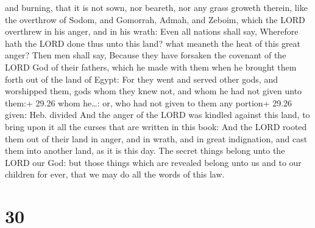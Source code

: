 and burning, that it is not sown, nor beareth, nor any grass groweth
therein, like the overthrow of Sodom, and Gomorrah, Admah, and Zeboim,
which the LORD overthrew in his anger, and in his wrath: 
Even all nations shall say, Wherefore hath the LORD done thus unto this
land? what meaneth the heat of this great anger?  Then men
shall say, Because they have forsaken the covenant of the LORD God of
their fathers, which he made with them when he brought them forth out of
the land of Egypt:  For they went and served other gods,
and worshipped them, gods whom they knew not, and whom he had not given
unto them:+ 29.26 whom he\ldots: or, who had not given to them any
portion+ 29.26 given: Heb. divided  And the anger of the
LORD was kindled against this land, to bring upon it all the curses that
are written in this book:  And the LORD rooted them out of
their land in anger, and in wrath, and in great indignation, and cast
them into another land, as it is this day.  The secret
things belong unto the LORD our God: but those things which are revealed
belong unto us and to our children for ever, that we may do all the
words of this law.

\hypertarget{section-29}{%
\section{30}\label{section-29}}

